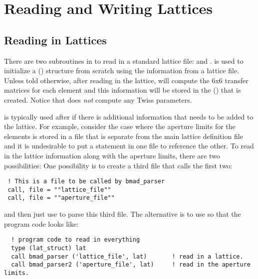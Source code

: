 \chapter{Reading and Writing Lattices}

\section{Reading in Lattices}
\label{s:lat.readin}

There are two subroutines in \bmad to read in a \bmad standard lattice file:
 and . 
is used to initialize a  () structure from scratch using the
information from a lattice file. Unless told otherwise, after reading in the lattice,
 will compute the 6x6 transfer matrices for each element and this information will
be stored in the  () that is created.  Notice that
 does {\em not} compute any Twiss parameters.

 is typically used after  if there is
additional information that needs to be added to the lattice. For example, consider the case where
the aperture limits for the elements is stored in a file that is separate from the main lattice
definition file and it is undesirable to put a  statement in one file to reference the
other.  To read in the lattice information along with the aperture limits, there are two
possibilities: One possibility is to create a third file that calls the first two:
\begin{verbatim}
 ! This is a file to be called by bmad_parser
 call, file = ""lattice_file""
 call, file = ""aperture_file""
\end{verbatim}
and then just use  to parse this third file. The
alternative is to use  so that the program code looks
like:
\begin{verbatim}
  ! program code to read in everything
  type (lat_struct) lat
  call bmad_parser ('lattice_file', lat)       ! read in a lattice.
  call bmad_parser2 ('aperture_file', lat)     ! read in the aperture limits.
\end{verbatim}

